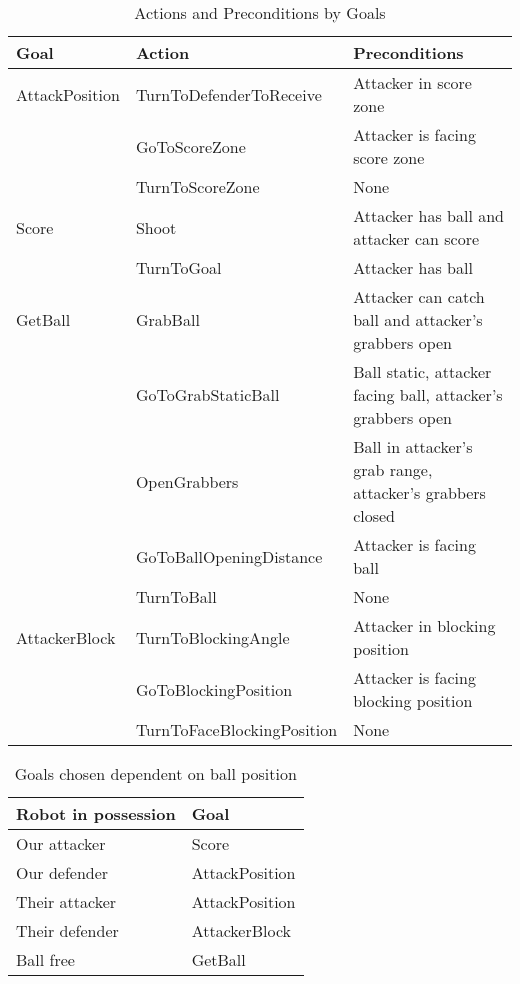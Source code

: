 \begin{table}[h]
\centering
\begin{tabularx}{\textwidth}{l l X}
\toprule
\textbf{Goal} & \textbf{Action} & \textbf{Preconditions} \\ 
\midrule

AttackPosition & TurnToDefenderToReceive & Attacker in score zone \\ 
&GoToScoreZone & Attacker is facing score zone  \\ 
&TurnToScoreZone & None \\
\midrule

Score & Shoot & Attacker has ball and attacker can score \\ 
& TurnToGoal & Attacker has ball \\ 
\midrule

GetBall & GrabBall & Attacker can catch ball and attacker's grabbers open \\ 
& GoToGrabStaticBall & Ball static, attacker facing ball, attacker's grabbers open \\ &OpenGrabbers & Ball in attacker's grab range, attacker's grabbers closed \\ 
&GoToBallOpeningDistance & Attacker is facing ball \\
&TurnToBall & None \\ 
\midrule

AttackerBlock & TurnToBlockingAngle & Attacker in blocking position \\ 
& GoToBlockingPosition & Attacker is facing blocking position \\ 
& TurnToFaceBlockingPosition & None \\ 
\bottomrule
\end{tabularx}
\caption{Actions and Preconditions by Goals}
\label{tbl:goals-actions}
\end{table}


\begin{table}[h]
\centering
\begin{tabular}{ l l}
\toprule
\textbf{Robot in possession} & \textbf{Goal} \\ \midrule
Our attacker & Score \\
Our defender & AttackPosition \\
Their attacker & AttackPosition \\
Their defender & AttackerBlock \\
Ball free & GetBall \\ \bottomrule
\end{tabular}
\caption{Goals chosen dependent on ball position}
\label{tbl:goals}
\end{table}

